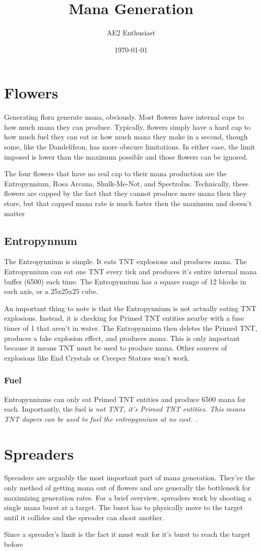 \documentclass{article}
\title{Mana Generation}
\author{AE2 Enthusiast}
\date{\today}
\begin{document}
\maketitle
\tableofcontents

\section{Flowers}
Generating flora generate mana, obviously. Most flowers have internal caps to
how much mana they can produce. Typically, flowers simply have a hard cap to how
much fuel they can eat or how much mana they make in a second, though some, like
the Dandelifeon, has more obscure limitations. In either case, the limit imposed
is lower than the maximum possible and those flowers can be ignored.

The four flowers that have no real cap to their mana production are the
Entropynnium, Rosa Arcana, Shulk-Me-Not, and Spectrolus. Technically, these
flowers are capped by the fact that they cannot produce more mana then they
store, but that capped mana rate is much faster then the maximum and doesn't
matter

\subsection{Entropynnum}
The Entropynnium is simple. It eats TNT explosions and produces mana. The
Entropynnium can eat one TNT every tick and produces it's entire internal mana
buffer (6500) each time. The Entropynnium has a square range of 12 blocks in
each axis, or a 25x25x25 cube.

An important thing to note is that the Entropynnium is not actually eating TNT
explosions. Instead, it is checking for Primed TNT entities nearby with a fuse
timer of 1 that aren't in water. The Entropynnium then deletes the Primed TNT,
produces a fake explosion effect, and produces mana. This is only important
because it means TNT must be used to produce mana. Other sources of explosions
like End Crystals or Creeper Statues won't work.

\subsubsection{Fuel}
Entropynniums can only eat Primed TNT entities and produce 6500 mana for
each. Importantly, the fuel is \it{not} TNT, it's Primed TNT entities. This
means TNT dupers can be used to fuel the entropynnium at no cost.
.
\section{Spreaders}
Spreaders are arguably the most important part of mana generation. They're the
only method of getting mana out of flowers and are generally the bottleneck for
maximizing generation rates. For a brief overview, spreaders work by shooting a
single mana burst at a target. The burst has to physically move to the target
until it collides and the spreader can shoot another.

Since a spreader's limit is the fact it must wait for it's burst to reach the
target before 
\end{document}
